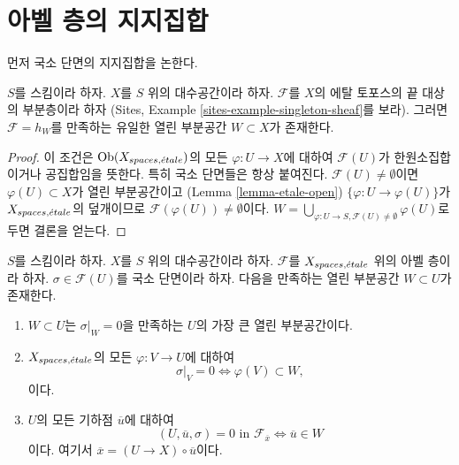 \section{아벨 층의 지지집합}
\label{section-support}

\noindent
먼저 국소 단면의 지지집합을 논한다.

\begin{lemma}
\label{lemma-support-subsheaf-final}
$S$를 스킴이라 하자. $X$를 $S$ 위의 대수공간이라 하자.
$\mathcal{F}$를 $X$의 에탈 토포스의 끝 대상의 부분층이라 하자
(Sites, Example \ref{sites-example-singleton-sheaf}를 보라).
그러면 $\mathcal{F} = h_W$를 만족하는 유일한 열린 부분공간
$W \subset X$가 존재한다.
\end{lemma}

\begin{proof}
이 조건은 $\mathop{\mathrm{Ob}}\nolimits(X_{spaces, {\acute{e}tale}})$의 모든
$\varphi : U \to X$에 대하여 $\mathcal{F}(U)$가 한원소집합이거나
공집합임을 뜻한다. 특히 국소 단면들은 항상 붙여진다.
$\mathcal{F}(U) \not = \emptyset$이면
$\varphi(U) \subset X$가 열린 부분공간이고
(Lemma \ref{lemma-etale-open})
$\{\varphi : U \to \varphi(U)\}$가 $X_{spaces, {\acute{e}tale}}$의
덮개이므로 $\mathcal{F}(\varphi(U)) \not = \emptyset$이다.
$W = \bigcup_{\varphi : U \to S, \mathcal{F}(U) \not = \emptyset} \varphi(U)$로
두면 결론을 얻는다.
\end{proof}

\begin{lemma}
\label{lemma-zero-over-image}
$S$를 스킴이라 하자.
$X$를 $S$ 위의 대수공간이라 하자.
$\mathcal{F}$를 $X_{spaces, {\acute{e}tale}}$ 위의 아벨 층이라 하자.
$\sigma \in \mathcal{F}(U)$를 국소 단면이라 하자.
다음을 만족하는 열린 부분공간 $W \subset U$가 존재한다.
\begin{enumerate}
\item $W \subset U$는 $\sigma|_W = 0$을 만족하는
$U$의 가장 큰 열린 부분공간이다.
\item $X_{spaces, {\acute{e}tale}}$의 모든 $\varphi : V \to U$에 대하여
$$
\sigma|_V = 0 \Leftrightarrow \varphi(V) \subset W,
$$
이다.
\item $U$의 모든 기하점 $\overline{u}$에 대하여
$$
(U, \overline{u}, \sigma) = 0\text{ in }\mathcal{F}_{\overline{x}}
\Leftrightarrow
\overline{u} \in W
$$
이다. 여기서 $\overline{x} = (U \to X) \circ \overline{u}$이다.
\end{enumerate}
\end{lemma}

